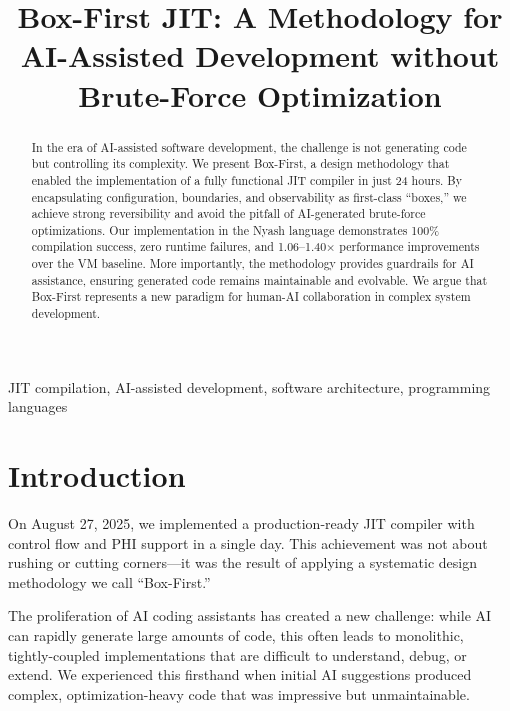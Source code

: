 \documentclass[10pt,conference]{IEEEtran}
\begin{document}
\title{Box-First JIT: A Methodology for AI-Assisted Development without Brute-Force Optimization}

\author{
}

\maketitle

\begin{abstract}
In the era of AI-assisted software development, the challenge is not generating code but controlling its complexity. We present Box-First, a design methodology that enabled the implementation of a fully functional JIT compiler in just 24 hours. By encapsulating configuration, boundaries, and observability as first-class ``boxes,'' we achieve strong reversibility and avoid the pitfall of AI-generated brute-force optimizations. Our implementation in the Nyash language demonstrates 100\% compilation success, zero runtime failures, and 1.06--1.40× performance improvements over the VM baseline. More importantly, the methodology provides guardrails for AI assistance, ensuring generated code remains maintainable and evolvable. We argue that Box-First represents a new paradigm for human-AI collaboration in complex system development.
\end{abstract}

\begin{IEEEkeywords}
JIT compilation, AI-assisted development, software architecture, programming languages
\end{IEEEkeywords}

\section{Introduction}

On August 27, 2025, we implemented a production-ready JIT compiler with control flow and PHI support in a single day. This achievement was not about rushing or cutting corners---it was the result of applying a systematic design methodology we call ``Box-First.''

The proliferation of AI coding assistants has created a new challenge: while AI can rapidly generate large amounts of code, this often leads to monolithic, tightly-coupled implementations that are difficult to understand, debug, or extend. We experienced this firsthand when initial AI suggestions produced complex, optimization-heavy code that was impressive but unmaintainable.
\end{document}
